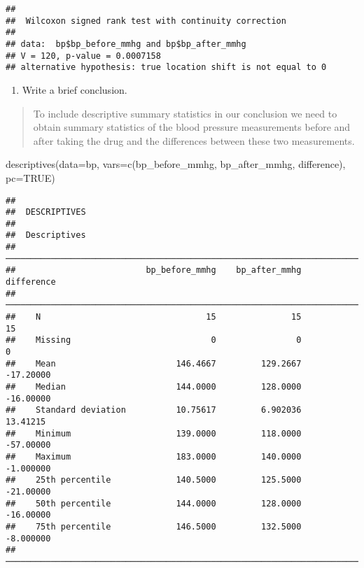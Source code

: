 \documentclass[
]{memoir}
\newenvironment{Shaded}{\begin{snugshade}}{\end{snugshade}}
\newcommand{\AttributeTok}[1]{\textcolor[rgb]{0.77,0.63,0.00}{#1}}
\newcommand{\ConstantTok}[1]{\textcolor[rgb]{0.00,0.00,0.00}{#1}}
\newcommand{\FunctionTok}[1]{\textcolor[rgb]{0.00,0.00,0.00}{#1}}
\newcommand{\NormalTok}[1]{#1}
\providecommand{\tightlist}{%
  \setlength{\itemsep}{0pt}\setlength{\parskip}{0pt}}
\begin{document}
\begin{verbatim}
## 
##  Wilcoxon signed rank test with continuity correction
## 
## data:  bp$bp_before_mmhg and bp$bp_after_mmhg
## V = 120, p-value = 0.0007158
## alternative hypothesis: true location shift is not equal to 0
\end{verbatim}

\begin{enumerate}
\def\labelenumi{\alph{enumi})}
\setcounter{enumi}{2}
\tightlist
\item
  Write a brief conclusion.
\end{enumerate}

\begin{quote}
To include descriptive summary statistics in our conclusion we need to obtain summary statistics of the blood pressure measurements before and after taking the drug and the differences between these two measurements.
\end{quote}

\begin{Shaded}
\begin{Highlighting}[]
\FunctionTok{descriptives}\NormalTok{(}\AttributeTok{data=}\NormalTok{bp, }\AttributeTok{vars=}\FunctionTok{c}\NormalTok{(bp\_before\_mmhg, bp\_after\_mmhg, difference),}
             \AttributeTok{pc=}\ConstantTok{TRUE}\NormalTok{)}
\end{Highlighting}
\end{Shaded}

\begin{verbatim}
## 
##  DESCRIPTIVES
## 
##  Descriptives                                                            
##  ─────────────────────────────────────────────────────────────────────── 
##                          bp_before_mmhg    bp_after_mmhg    difference   
##  ─────────────────────────────────────────────────────────────────────── 
##    N                                 15               15            15   
##    Missing                            0                0             0   
##    Mean                        146.4667         129.2667     -17.20000   
##    Median                      144.0000         128.0000     -16.00000   
##    Standard deviation          10.75617         6.902036      13.41215   
##    Minimum                     139.0000         118.0000     -57.00000   
##    Maximum                     183.0000         140.0000     -1.000000   
##    25th percentile             140.5000         125.5000     -21.00000   
##    50th percentile             144.0000         128.0000     -16.00000   
##    75th percentile             146.5000         132.5000     -8.000000   
##  ───────────────────────────────────────────────────────────────────────
\end{verbatim}
\end{document}
